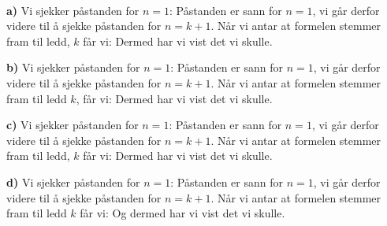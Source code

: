 \\
\textbf{a)} Vi sjekker påstanden for $ {n=1}$:
Påstanden er sann for $ {n=1} $, vi går derfor videre til å sjekke påstanden for $ {n=k+1} $. Når vi antar at formelen stemmer fram til ledd, $ k $ får vi:
Dermed har vi vist det vi skulle.

\textbf{b)} Vi sjekker påstanden for $ {n=1} $:
Påstanden er sann for $ n=1 $, vi går derfor videre til å sjekke påstanden for $ n=k+1 $. Når vi antar at formelen stemmer fram til ledd $ k $, får vi:
Dermed har vi vist det vi skulle.

\textbf{c)} 
Vi sjekker påstanden for $ {n=1}$:
Påstanden er sann for $ {n=1} $, vi går derfor videre til å sjekke påstanden for $ {n=k+1} $. Når vi antar at formelen stemmer fram til ledd, $ k $ får vi:
Dermed har vi vist det vi skulle.

\textbf{d)} Vi sjekker påstanden for $ n=1 $:
Påstanden er sann for $ n=1 $, vi går derfor videre til å sjekke påstanden for $ n=k+1 $. Når vi antar at formelen stemmer fram til ledd $ k $ får vi:
Og dermed har vi vist det vi skulle. 

